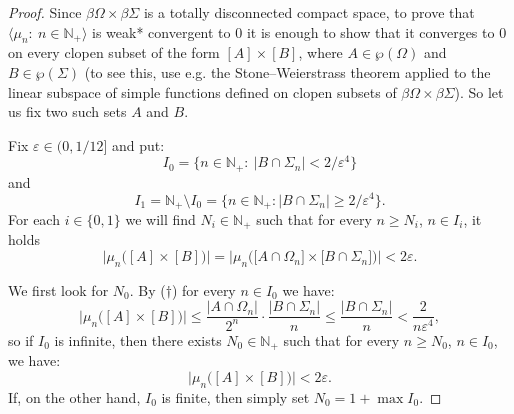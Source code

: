 \documentclass[11pt]{amsart}
\theoremstyle{definition}
\theoremstyle{remark}
\numberwithin{equation}{section}
\newcommand{\eps}{\varepsilon}
\newcommand{\N}{\mathbb{N}}
\newcommand{\sm}{\setminus}
\newcommand{\seq}[2]{\big\langle#1\colon\ #2\big\rangle}
\newcommand{\io}{\in\mathbb{N}}%
\begin{document}
\begin{proof}
Since $\beta\Omega\times\beta\Sigma$ is a totally disconnected compact space, to prove that $\seq{\mu_n}{n\io_+}$ is weak* convergent to $0$ it is enough to show that it converges to $0$ on every clopen subset of the form $[A]\times[B]$, where $A\in\wp(\Omega)$ and $B\in\wp(\Sigma)$ (to see this, use e.g. the Stone--Weierstrass theorem applied to the linear subspace of simple functions defined on clopen subsets of $\beta\Omega\times\beta\Sigma$). So let us fix two such sets $A$ and $B$.%

Fix $\eps\in\big(0,1/12\big]$ and put:
\[I_0=\big\{n\io_+\colon\ \big|B\cap\Sigma_n\big|<2/\eps^4\big\}\]
and
\[I_1=\N_+\sm I_0=\big\{n\io_+\colon \big|B\cap\Sigma_n\big|\ge2/\eps^4\big\}.\]
For each $i\in\{0,1\}$ we will find $N_i\io_+$ such that for every $n\ge N_i$, $n\in I_i$, it holds
\[\big|\mu_n\big([A]\times[B]\big)\big|=\big|\mu_n\big(\big[A\cap\Omega_n\big]\times\big[B\cap\Sigma_n\big]\big)\big|<2\eps.\]

\medskip

We first look for $N_0$. By ($\dagger$) for every $n\in I_0$ we have:
\[\big|\mu_n\big([A]\times[B]\big)\big|\le\frac{\big|A\cap \Omega_n\big|}{2^n}\cdot\frac{\big|B\cap\Sigma_n\big|}{n}\le\frac{\big|B\cap\Sigma_n\big|}{n}<\frac{2}{n\eps^4},\]
so if $I_0$ is infinite, then there exists $N_0\io_+$ such that for every $n\ge N_0$, $n\in I_0$, we have:
\[\big|\mu_n\big([A]\times[B]\big)\big|<2\eps.\]
If, on the other hand, $I_0$ is finite, then simply set $N_0=1+\max I_0$.

\medskip


\end{proof}
\end{document}
